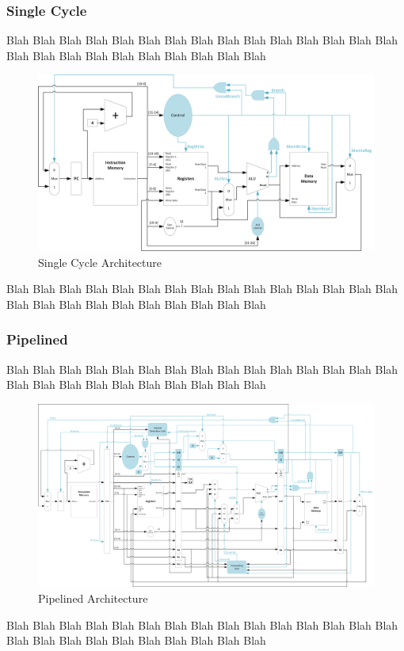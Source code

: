 \documentclass[letter,14pt]{article}
\begin{document}
	\subsubsection{Single Cycle}
	Blah Blah Blah Blah Blah Blah Blah Blah Blah Blah Blah Blah Blah Blah Blah Blah Blah Blah Blah Blah Blah Blah Blah Blah Blah 
	\begin{figure}[H]
	\begin{center}
	\includegraphics[width=1\linewidth]{SingleCycleArch.png}
	\caption{Single Cycle Architecture}
	\end{center}
	\end{figure}
	\noindent
	Blah Blah Blah Blah Blah Blah Blah Blah Blah Blah Blah Blah Blah Blah Blah Blah Blah Blah Blah Blah Blah Blah Blah Blah Blah 
	
	\newpage
	\subsubsection{Pipelined}
	Blah Blah Blah Blah Blah Blah Blah Blah Blah Blah Blah Blah Blah Blah Blah Blah Blah Blah Blah Blah Blah Blah Blah Blah Blah 
	\begin{figure}[H]
	\begin{center}
	\includegraphics[width=1\linewidth]{PipelinedArch.png}
	\caption{Pipelined Architecture}
	\end{center}
	\end{figure}
	\noindent
	Blah Blah Blah Blah Blah Blah Blah Blah Blah Blah Blah Blah Blah Blah Blah Blah Blah Blah Blah Blah Blah Blah Blah Blah Blah 
\end{document}
